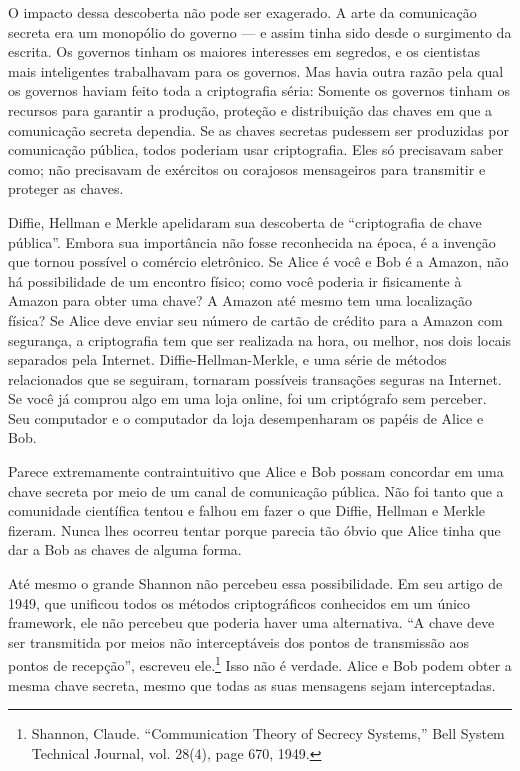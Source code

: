 \documentclass{book}
\begin{document}
O impacto dessa descoberta não pode ser exagerado. A arte da comunicação secreta era um monopólio do governo --- e assim tinha sido desde o surgimento da escrita. Os governos tinham os maiores interesses em segredos, e os cientistas mais inteligentes trabalhavam para os governos. Mas havia outra razão pela qual os governos haviam feito toda a criptografia séria: Somente os governos tinham os recursos para garantir a produção, proteção e distribuição das chaves em que a comunicação secreta dependia. Se as chaves secretas pudessem ser produzidas por comunicação pública, todos poderiam usar criptografia. Eles só precisavam saber como; não precisavam de exércitos ou corajosos mensageiros para transmitir e proteger as chaves.

Diffie, Hellman e Merkle apelidaram sua descoberta de ``criptografia de chave pública''. Embora sua importância não fosse reconhecida na época, é a invenção que tornou possível o comércio eletrônico. Se Alice é você e Bob é a Amazon, não há possibilidade de um encontro físico; como você poderia ir fisicamente à Amazon para obter uma chave? A Amazon até mesmo tem uma localização física? Se Alice deve enviar seu número de cartão de crédito para a Amazon com segurança, a criptografia tem que ser realizada na hora, ou melhor, nos dois locais separados pela Internet. Diffie-Hellman-Merkle, e uma série de métodos relacionados que se seguiram, tornaram possíveis transações seguras na Internet. Se você já comprou algo em uma loja online, foi um criptógrafo sem perceber. Seu computador e o computador da loja desempenharam os papéis de Alice e Bob.

Parece extremamente contraintuitivo que Alice e Bob possam concordar em uma chave secreta por meio de um canal de comunicação pública. Não foi tanto que a comunidade científica tentou e falhou em fazer o que Diffie, Hellman e Merkle fizeram. Nunca lhes ocorreu tentar porque parecia tão óbvio que Alice tinha que dar a Bob as chaves de alguma forma.

Até mesmo o grande Shannon não percebeu essa possibilidade. Em seu artigo de 1949, que unificou todos os métodos criptográficos conhecidos em um único framework, ele não percebeu que poderia haver uma alternativa. ``A chave deve ser transmitida por meios não interceptáveis dos pontos de transmissão aos pontos de recepção'', escreveu ele.\footnote{Shannon, Claude. “Communication Theory of Secrecy Systems,” Bell System Technical Journal, vol. 28(4), page 670, 1949.} Isso não é verdade. Alice e Bob podem obter a mesma chave secreta, mesmo que todas as suas mensagens sejam interceptadas.
\end{document}
